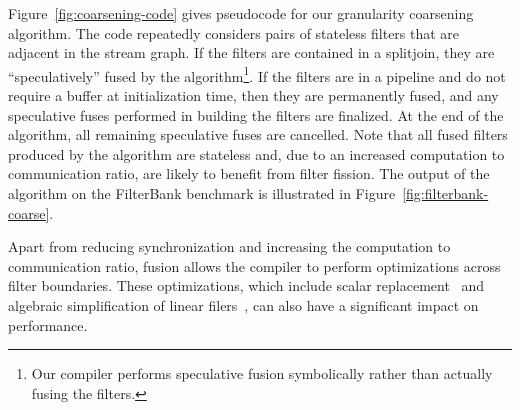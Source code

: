 Figure~\ref{fig:coarsening-code} gives pseudocode for our granularity
coarsening algorithm.  The code repeatedly considers pairs of
stateless filters that are adjacent in the stream graph.  If the
filters are contained in a splitjoin, they are ``speculatively'' fused
by the algorithm\footnote{Our compiler performs speculative fusion
symbolically rather than actually fusing the filters.}.  
If the filters are in a pipeline and do not require a buffer at
initialization time, then they are permanently fused, and any
speculative fuses performed in building the filters are finalized.  At
the end of the algorithm, all remaining speculative fuses are
cancelled.  Note that all fused filters produced by the algorithm are
stateless and, due to an increased computation to communication ratio,
are likely to benefit from filter fission.  The output of the
algorithm on the FilterBank benchmark is illustrated in
Figure~\ref{fig:filterbank-coarse}.

Apart from reducing synchronization and increasing the computation to
communication ratio, fusion allows the compiler to perform
optimizations across filter boundaries.  These optimizations, which
include scalar replacement~\cite{sermulins05lctes} and algebraic
simplification of linear filers~\cite{lamb03pldi,agrawal05cases}, can
also have a significant impact on performance.




